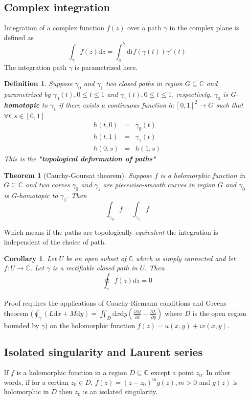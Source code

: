 \documentclass[jcp,groupaddress]{revtex4-1}
\newtheorem{theorem}{Theorem}
\newtheorem{definition}{Definition}
\newtheorem{corollary}{Corollary}[theorem]
\newcommand{\eq}{\begin{equation}}
\newcommand{\qe}{\end{equation}}
\newcommand{\diff}{\mathrm{d}}
\begin{document}
\begin{appendices}
\subsection{Complex integration}
Integration of a complex function $f(z)$ over a path $\gamma$ in the complex plane is defined as 
\eq
 \int_{\gamma} f(z) \diff z = \int_{a}^{b} \diff t f(\gamma(t))\gamma'(t) 
\qe
The integration path $\gamma$ is parametrized here. 
\begin{definition}
Suppose $\gamma_{0}$ and $\gamma_{1}$ two closed paths in region $G \subseteq \mathbb{C}$ and parametrized by $\gamma_{0}(t), 0\leq t \leq1$ and $\gamma_{1}(t), 0 \leq t \leq1$, respectively.  $\gamma_{0}$ is G-\textbf{homotopic} to $\gamma_{1}$ if there exists a continuous function $h:[0, 1]^{2} \to G$ such that $\forall t, s \in [0, 1]$
 \begin{eqnarray}
   h(t, 0) &=& \gamma_{0}(t) \nonumber \\
   h(t, 1) &=& \gamma_{1}(t)\\
   h(0, s)&=& h(1,s) \nonumber
 \end{eqnarray}
This is the \textbf{"topological deformation of paths"}
\end{definition}

\begin{theorem}[Cauchy-Goursat theorem]
Suppose $f$ is a holomorphic function in $G\subseteq \mathbb{C}$ and two carves $\gamma_{0}$ and $\gamma_{1}$ are \textit{piecewise-smooth curves} in region $G$  and $\gamma_{0}$ is G-homotopic to $\gamma_{1}$. Then 
\eq
 \int_{\gamma_{0}} f = \int_{\gamma_{1}} f
\qe
\end{theorem}
Which means if the paths are topologically \emph{equivalent} the integration is independent of the choice of path.
\begin{corollary}
Let $U$ be an open subset of $\mathbb{C}$ which is simply connected and let $f : U \rightarrow \mathbb{C}$. Let $\gamma$ is a rectifiable closed path in $U$. Then
\eq
\oint_{\gamma} f(z) dz = 0
\qe 
\end{corollary}
Proof requires the applications of Cauchy-Riemann conditions and Greens theorem ($\oint_{\gamma} (L \diff x + M \diff y) = \iint_{D}\diff x \diff y (\frac{\partial M}{\partial x} -\frac{\partial L}{\partial y} ) $ where $D$ is the open region bounded by $\gamma$) on the holomorphic function $f(z) = u (x, y) + i v(x, y)$. 
\subsection{Isolated singularity and Laurent series}
If $f$ is a holomorphic function in a region $D\subseteq \mathbb{C}$ except a point $z_{0}$. In other words, if for a certian $z_{0} \in D$, $f(z) = (z-z_{0})^{m} g(z), m > 0$ and $g(z)$ is holomorphic in $D$ then $z_{0}$ is an isolated singularity. 


\end{appendices}
\end{document}

